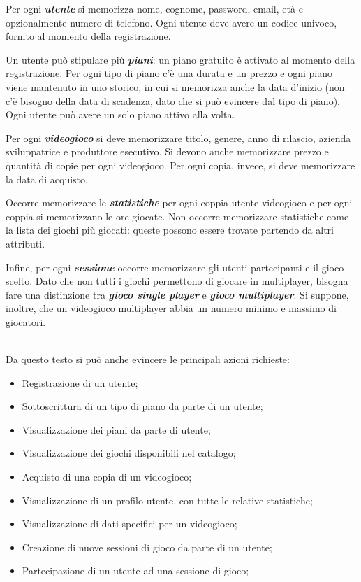 \documentclass[a4paper,12pt]{report}
\begin{document}
\begin{addmargin}[4em]{4em}
Per ogni \textbf{\textit{utente}} si memorizza nome, cognome, password, email, età e opzionalmente numero di telefono. Ogni utente deve avere un codice univoco, fornito al momento della registrazione.

Un utente può stipulare più \textbf{\textit{piani}}: un piano gratuito è attivato al momento della registrazione. Per ogni tipo di piano c'è una durata e un prezzo e ogni piano viene mantenuto in uno storico, in cui si memorizza anche la data d'inizio (non c'è bisogno della data di scadenza, dato che si può evincere dal tipo di piano). Ogni utente può avere un solo piano attivo alla volta.

Per ogni \textbf{\textit{videogioco}} si deve memorizzare titolo, genere, anno di rilascio, azienda sviluppatrice e produttore esecutivo. Si devono anche memorizzare prezzo e quantità di copie per ogni videogioco. Per ogni copia, invece, si deve memorizzare la data di acquisto.

Occorre memorizzare le \textbf{\textit{statistiche}} per ogni coppia utente-videogioco e per ogni coppia si memorizzano le ore giocate. Non occorre memorizzare statistiche come la lista dei giochi più giocati: queste possono essere trovate partendo da altri attributi.

Infine, per ogni \textbf{\textit{sessione}} occorre memorizzare gli utenti partecipanti e il gioco scelto. Dato che non tutti i giochi permettono di giocare in multiplayer, bisogna fare una distinzione tra \textbf{\textit{gioco single player}} e \textbf{\textit{gioco multiplayer}}. Si suppone, inoltre, che un videogioco multiplayer abbia un numero minimo e massimo di giocatori. \\\\

\end{addmargin}

Da questo testo si può anche evincere le principali azioni richieste:

\begin{itemize}
\item Registrazione di un utente;
\item Sottoscrittura di un tipo di piano da parte di un utente;
\item Visualizzazione dei piani da parte di utente;
\item Visualizzazione dei giochi disponibili nel catalogo;
\item Acquisto di una copia di un videogioco;
\item Visualizzazione di un profilo utente, con tutte le relative statistiche;
\item Visualizzazione di dati specifici per un videogioco;
\item Creazione di nuove sessioni di gioco da parte di un utente;
\item Partecipazione di un utente ad una sessione di gioco;
\end{itemize}
\end{document}
